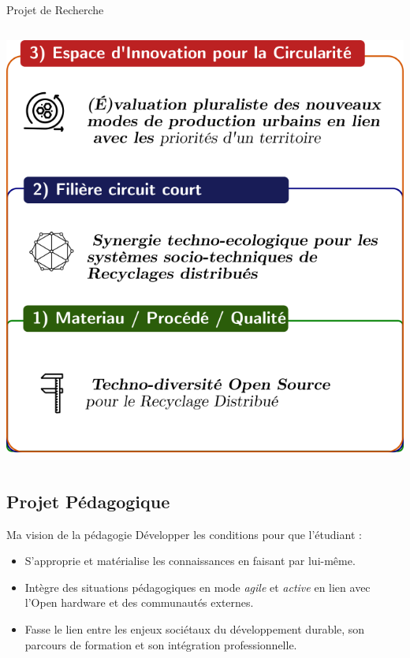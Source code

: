 \documentclass[
  11pt,
  ignorenonframetext,
  aspectratio=169,
  c]{beamer}
\begin{document}
\begin{frame}[t]{Projet de Recherche}
\begin{columns}[T]
\begin{column}{0.4\textwidth}
\includegraphics{Figures/slides/Projet-ERPI.png}
\end{column}
\end{columns}
\end{frame}

\hypertarget{projet-puxe9dagogique}{%
\subsection{Projet Pédagogique}\label{projet-puxe9dagogique}}

\begin{frame}{Ma vision de la pédagogie}
\protect\hypertarget{ma-vision-de-la-puxe9dagogie}{}
Développer les conditions pour que l'étudiant :

\begin{itemize}
\item
  S'approprie et matérialise les connaissances en faisant par lui-même.
\item
  Intègre des situations pédagogiques en mode \emph{agile} et
  \emph{active} en lien avec l'Open hardware et des communautés
  externes.
\item
  Fasse le lien entre les enjeux sociétaux du développement durable, son
  parcours de formation et son intégration professionnelle.
\end{itemize}
\end{frame}
\end{document}

